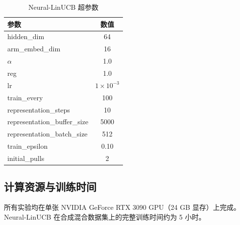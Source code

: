 \begin{table}[htb]
  \centering
  \caption{Neural-LinUCB 超参数}
  \label{tab:default-hparams}
  \begin{tabular}{lc}
    \toprule
    参数 & 数值 \\
    \midrule
    hidden\_dim & 64 \\
    arm\_embed\_dim & 16 \\
    $\alpha$ & 1.0 \\
    reg & 1.0 \\
    lr & $1\times 10^{-3}$ \\
    train\_every & 100 \\
    representation\_steps & 10 \\
    representation\_buffer\_size & 5000 \\
    representation\_batch\_size & 512 \\
    train\_epsilon & 0.10 \\
    initial\_pulls & 2 \\
    \bottomrule
  \end{tabular}
\end{table}

\subsection{计算资源与训练时间}

所有实验均在单张 NVIDIA GeForce RTX 3090 GPU（24 GB 显存）上完成。
Neural-LinUCB 在合成混合数据集上的完整训练时间约为 5 小时。